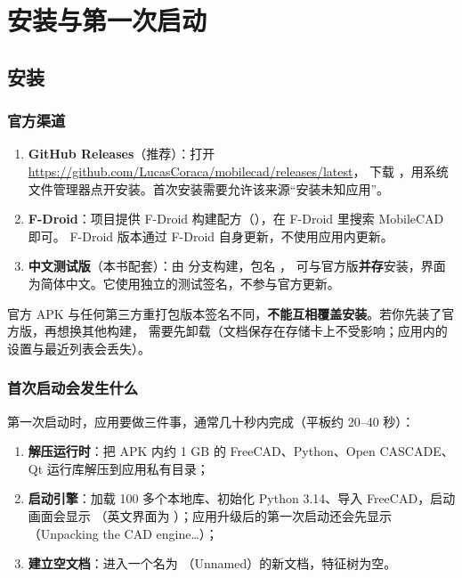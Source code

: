 \chapter{安装与第一次启动}

\section{安装}

\subsection{官方渠道}

\begin{enumerate}
  \item \textbf{GitHub Releases}（推荐）：打开 \url{https://github.com/LucasCoraca/mobilecad/releases/latest}，
        下载 ，用系统文件管理器点开安装。首次安装需要允许该来源“安装未知应用”。
  \item \textbf{F-Droid}：项目提供 F-Droid 构建配方（），在 F-Droid 里搜索 MobileCAD 即可。
        F-Droid 版本通过 F-Droid 自身更新，不使用应用内更新。
  \item \textbf{中文测试版}（本书配套）：由  分支构建，包名 ，
        可与官方版\textbf{并存}安装，界面为简体中文。它使用独立的测试签名，不参与官方更新。
\end{enumerate}

\begin{warn}[签名与升级]
官方 APK 与任何第三方重打包版本签名不同，\textbf{不能互相覆盖安装}。若你先装了官方版，再想换其他构建，
需要先卸载（文档保存在存储卡上不受影响；应用内的设置与最近列表会丢失）。
\end{warn}

\subsection{首次启动会发生什么}

第一次启动时，应用要做三件事，通常几十秒内完成（平板约 20--40 秒）：

\begin{enumerate}
  \item \textbf{解压运行时}：把 APK 内约 1 GB 的 FreeCAD、Python、Open CASCADE、Qt 运行库解压到应用私有目录；
  \item \textbf{启动引擎}：加载 100 多个本地库、初始化 Python 3.14、导入 FreeCAD，启动画面会显示
        （英文界面为 ）；应用升级后的第一次启动还会先显示
        （Unpacking the CAD engine…）；
  \item \textbf{建立空文档}：进入一个名为 （Unnamed）的新文档，特征树为空。
\end{enumerate}

